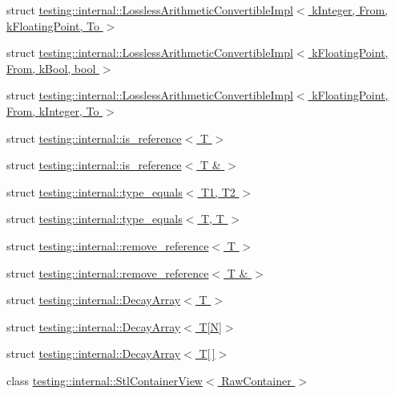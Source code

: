 \begin{DoxyCompactItemize}
\item 
struct \hyperlink{structtesting_1_1internal_1_1_lossless_arithmetic_convertible_impl_3_01k_integer_00_01_from_00_01k_floating_point_00_01_to_01_4}{testing\+::internal\+::\+Lossless\+Arithmetic\+Convertible\+Impl$<$ k\+Integer, From, k\+Floating\+Point, To $>$}
\item 
struct \hyperlink{structtesting_1_1internal_1_1_lossless_arithmetic_convertible_impl_3_01k_floating_point_00_01_from_00_01k_bool_00_01bool_01_4}{testing\+::internal\+::\+Lossless\+Arithmetic\+Convertible\+Impl$<$ k\+Floating\+Point, From, k\+Bool, bool $>$}
\item 
struct \hyperlink{structtesting_1_1internal_1_1_lossless_arithmetic_convertible_impl_3_01k_floating_point_00_01_from_00_01k_integer_00_01_to_01_4}{testing\+::internal\+::\+Lossless\+Arithmetic\+Convertible\+Impl$<$ k\+Floating\+Point, From, k\+Integer, To $>$}
\item 
struct \hyperlink{structtesting_1_1internal_1_1is__reference}{testing\+::internal\+::is\+\_\+reference$<$ T $>$}
\item 
struct \hyperlink{structtesting_1_1internal_1_1is__reference_3_01_t_01_6_01_4}{testing\+::internal\+::is\+\_\+reference$<$ T \& $>$}
\item 
struct \hyperlink{structtesting_1_1internal_1_1type__equals}{testing\+::internal\+::type\+\_\+equals$<$ T1, T2 $>$}
\item 
struct \hyperlink{structtesting_1_1internal_1_1type__equals_3_01_t_00_01_t_01_4}{testing\+::internal\+::type\+\_\+equals$<$ T, T $>$}
\item 
struct \hyperlink{structtesting_1_1internal_1_1remove__reference}{testing\+::internal\+::remove\+\_\+reference$<$ T $>$}
\item 
struct \hyperlink{structtesting_1_1internal_1_1remove__reference_3_01_t_01_6_01_4}{testing\+::internal\+::remove\+\_\+reference$<$ T \& $>$}
\item 
struct \hyperlink{structtesting_1_1internal_1_1_decay_array}{testing\+::internal\+::\+Decay\+Array$<$ T $>$}
\item 
struct \hyperlink{structtesting_1_1internal_1_1_decay_array_3_01_t[_n]_4}{testing\+::internal\+::\+Decay\+Array$<$ T\mbox{[}\+N\mbox{]}$>$}
\item 
struct \hyperlink{structtesting_1_1internal_1_1_decay_array_3_01_t[]_4}{testing\+::internal\+::\+Decay\+Array$<$ T\mbox{[}$\,$\mbox{]}$>$}
\item 
class \hyperlink{classtesting_1_1internal_1_1_stl_container_view}{testing\+::internal\+::\+Stl\+Container\+View$<$ Raw\+Container $>$}

\end{DoxyCompactItemize}
